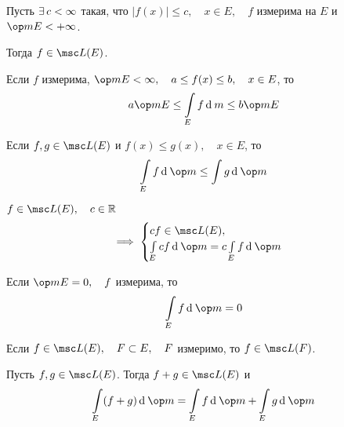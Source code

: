 \begin{props}
	\item Пусть $ \exists\, c < \infty $ такая, что $ |f(x)| \le c, \quad x \in E, \quad f $ измерима на $ E $ и $ \op m E < +\infty $.

	Тогда $ f \in \msc L(E) $.

	\item Если $ f $ измерима, $ \op m E < \infty, \quad a \le f(x) \le b, \quad x \in E $, то
	$$ a \op m E \le \int\limits_E f \di m \le b \op m E $$

	\item Если $ f, g \in \msc L(E) $ и $ f(x) \le g(x), \quad x \in E $, то
	$$ \int\limits_E f \di \op m \le \int g \di \op m $$

	\item $ f \in \msc L(E), \quad c \in \R $
	$$ \implies
	\begin{cases}
		cf \in \msc L(E), \\
		\int\limits_E cf \di \op m = c \int\limits_E f \di \op m
	\end{cases} $$

	\item Если $ \op m E = 0, \quad f $ измерима, то
	$$ \int\limits_E f \di \op m = 0 $$

	\item \label{en:lebeg_int_props:6} Если $ f \in \msc L(E), \quad F \sub E, \quad F $ измеримо, то $ f \in \msc L(F) $.

	\item Пусть $ f, g \in \msc L(E) $. Тогда $ f + g \in \msc L(E) $ и
	$$ \int\limits_E (f + g) \di \op m = \int\limits_E f \di \op m + \int\limits_E g \di \op m $$
\end{props}

